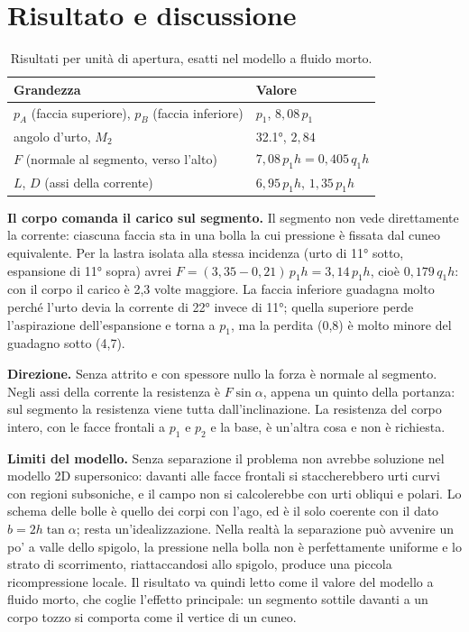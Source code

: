 \section*{Risultato e discussione}
\begin{table}[H]
\centering
\begin{tabular}{ll}
\toprule
Grandezza & Valore \\
\midrule
$p_A$ (faccia superiore), $p_B$ (faccia inferiore) & $p_1$, $8{,}08\,p_1$ \\
angolo d'urto, $M_2$ & \ang{32.1}, $2{,}84$ \\
$F$ (normale al segmento, verso l'alto) & $7{,}08\,p_1h=0{,}405\,q_1h$ \\
$L$, $D$ (assi della corrente) & $6{,}95\,p_1h$, $1{,}35\,p_1h$ \\
\bottomrule
\end{tabular}
\caption{Risultati per unità di apertura, esatti nel modello a fluido morto.}
\end{table}

\textbf{Il corpo comanda il carico sul segmento.} Il segmento non vede direttamente la corrente: ciascuna faccia sta
in una bolla la cui pressione è fissata dal cuneo equivalente. Per la lastra isolata alla stessa incidenza (urto di
\ang{11} sotto, espansione di \ang{11} sopra) avrei $F=(3{,}35-0{,}21)\,p_1h=3{,}14\,p_1h$, cioè $0{,}179\,q_1h$: con il
corpo il carico è 2,3 volte maggiore. La faccia inferiore guadagna molto perché l'urto devia la corrente di \ang{22}
invece di \ang{11}; quella superiore perde l'aspirazione dell'espansione e torna a $p_1$, ma la perdita (0,8) è molto
minore del guadagno sotto (4,7).

\textbf{Direzione.} Senza attrito e con spessore nullo la forza è normale al segmento. Negli assi della corrente la
resistenza è $F\sin\alpha$, appena un quinto della portanza: sul segmento la resistenza viene tutta
dall'inclinazione. La resistenza del corpo intero, con le facce frontali a $p_1$ e $p_2$ e la base, è un'altra cosa
e non è richiesta.

\textbf{Limiti del modello.} Senza separazione il problema non avrebbe soluzione nel modello 2D supersonico: davanti
alle facce frontali si staccherebbero urti curvi con regioni subsoniche, e il campo non si calcolerebbe con urti
obliqui e polari. Lo schema delle bolle è quello dei corpi con l'ago, ed è il solo coerente con il dato
$b=2h\tan\alpha$; resta un'idealizzazione. Nella realtà la separazione può avvenire un po' a valle dello spigolo, la
pressione nella bolla non è perfettamente uniforme e lo strato di scorrimento, riattaccandosi allo spigolo, produce
una piccola ricompressione locale. Il risultato va quindi letto come il valore del modello a fluido morto, che coglie
l'effetto principale: un segmento sottile davanti a un corpo tozzo si comporta come il vertice di un cuneo.


